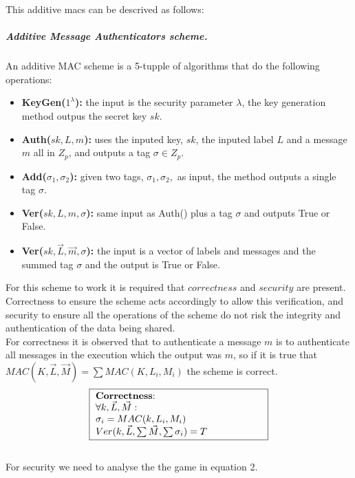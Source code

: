\documentclass{article}
\begin{document}
This additive macs can be descrived as follows:

\subparagraph{Additive Message Authenticators scheme.}An additive MAC scheme is a 5-tupple of algorithms that do the following operations:
\begin{itemize}
    \item \textbf{KeyGen($1^\lambda$):} the input is the security parameter $\lambda$, the key generation method outpus the secret key $sk$.
    \item  \textbf{Auth($sk,L,m$):} uses the inputed key, $sk$, the inputed label $L$ and a message $m$ all in $Z_p$, and outputs a tag $\sigma \in Z_p$.
    \item \textbf{Add($\sigma_1,\sigma_2$):} given two tags, $\sigma_1,\sigma_2,$ as input, the method outputs a single tag $\sigma$.
    \item \textbf{Ver($sk,L,m,\sigma$):} same input as Auth() plus a tag $\sigma$ and outputs True or False.
    \item \textbf{Ver($sk,\Vec{L},\Vec{m},\sigma$):} the input is a vector of labels and messages and the summed tag $\sigma$ and the output is True or False.
\end{itemize}

For this scheme to work it is required that $correctness$ and $security$ are present. Correctness to ensure the scheme acts accordingly to allow this verification, and security to ensure all the operations of the scheme do not risk the integrity and authentication of the data being shared.\\

For correctness it is observed that to authenticate a message $m$ is to authenticate all messages in the execution which the output was $m$, so if it is true that $MAC(K,\Vec{L},\Vec{M}) = \sum MAC(K,L_i,M_i)$ the scheme is correct.\\
\begin{equation}
 \centering
 \framebox{\setlength\tabcolsep{0pt}
 \begin{minipage}[t]{0.5\textwidth}
\textbf{Correctness}:\\
$\forall k, \Vec{L},\Vec{M} :$\\
$\sigma_i = MAC(k,L_i,M_i)$\\
$Ver(k,\Vec{L},\sum\Vec{M},\sum \sigma_i)=T$
\end{minipage}
}
\end{equation}
\\

For security we need to analyse the the game in equation 2.
\end{document}
